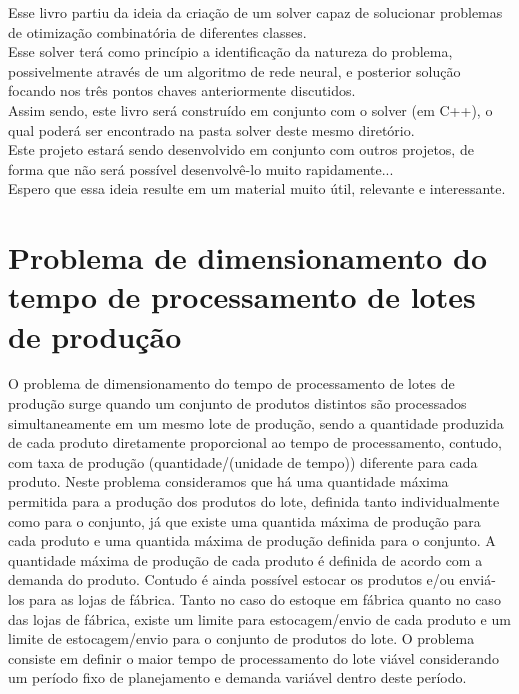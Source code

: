 \documentclass{book}
\begin{document}
Esse livro partiu da ideia da criação de um solver capaz de solucionar problemas de otimização combinatória de diferentes classes. \\

Esse solver terá como princípio a identificação da natureza do problema, possivelmente através de um algoritmo de rede neural, e posterior solução focando nos três pontos chaves anteriormente discutidos. \\

Assim sendo, este livro será construído em conjunto com o solver (em C++), o qual poderá ser encontrado na pasta solver deste mesmo diretório. \\

Este projeto estará sendo desenvolvido em conjunto com outros projetos, de forma que não será possível desenvolvê-lo muito rapidamente... \\

Espero que essa ideia resulte em um material muito útil, relevante e interessante.

\section{Problema de dimensionamento do tempo de processamento de lotes de produção}

O problema de dimensionamento do tempo de processamento de lotes de produção surge quando um conjunto de produtos distintos são processados simultaneamente em um mesmo lote de produção, sendo a quantidade produzida de cada produto diretamente proporcional ao tempo de processamento, contudo, com taxa de produção (quantidade/(unidade de tempo)) diferente para cada produto. Neste problema consideramos que há uma quantidade máxima permitida para a produção dos produtos do lote, definida tanto individualmente como para o conjunto, já que existe uma quantida máxima de produção para cada produto e uma quantida máxima de produção definida para o conjunto. A quantidade máxima de produção de cada produto é definida de acordo com a demanda do produto. Contudo é ainda possível estocar os produtos e/ou enviá-los para as lojas de fábrica. Tanto no caso do estoque em fábrica quanto no caso das lojas de fábrica, existe um limite para estocagem/envio de cada produto e um limite de estocagem/envio para o conjunto de produtos do lote. O problema consiste em definir o maior tempo de processamento do lote viável considerando um período fixo de planejamento e demanda variável dentro deste período. \\
\end{document}
